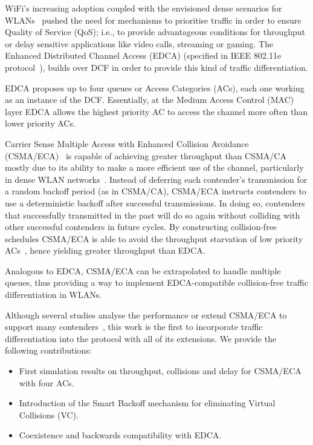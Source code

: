 \documentclass[a4paper,journal]{IEEEtran}
\begin{document}
WiFi's increasing adoption coupled with the envisioned dense scenarios for WLANs~\cite{HEW-scenarios} pushed the need for mechanisms to prioritise traffic in order to ensure Quality of Service (QoS); i.e., to provide advantageous conditions for throughput or delay sensitive applications like video calls, streaming or gaming. The Enhanced Distributed Channel Access (EDCA) (specified in IEEE 802.11e protocol~\cite{80211e}), builds over DCF in order to provide this kind of traffic differentiation.

EDCA proposes up to four queues or Access Categories (ACs), each one working as an instance of the DCF. Essentially, at the Medium Access Control (MAC) layer EDCA allows the highest priority AC to access the channel more often than lower priority ACs.

Carrier Sense Multiple Access with Enhanced Collision Avoidance (CSMA/ECA)~\cite{sanabria2014high,research2standards} is capable of achieving greater throughput than CSMA/CA mostly due to its ability to make a more efficient use of the channel, particularly in dense WLAN networks~\cite{sanabria2014high}. Instead of deferring each contender's transmission for a random backoff period (as in CSMA/CA), CSMA/ECA instructs contenders to use a deterministic backoff after successful transmissions. In doing so, contenders that successfully transmitted in the past will do so again without colliding with other successful contenders in future cycles. By constructing collision-free schedules CSMA/ECA is able to avoid the throughput starvation of low priority ACs~\cite{990806}, hence yielding greater throughput than EDCA.

Analogous to EDCA, CSMA/ECA can be extrapolated to handle multiple queues, thus providing a way to implement EDCA-compatible collision-free traffic differentiation in WLANs. 

Although several studies analyse the performance or extend CSMA/ECA to support many contenders~\cite{bellalta2009vtc,barcelo2011tcf,ECA-DEMO-INFOCOM14,research2standards,sanabria2014high}, this work is the first to incorporate traffic differentiation into the protocol with all of its extensions. We provide the following contributions:

\begin{itemize}
	\item First simulation results on throughput, collisions and delay for CSMA/ECA with four ACs.
	\item Introduction of the Smart Backoff mechanism for eliminating Virtual Collisions (VC).
	\item Coexistence and backwards compatibility with EDCA.
\end{itemize}
\end{document}
